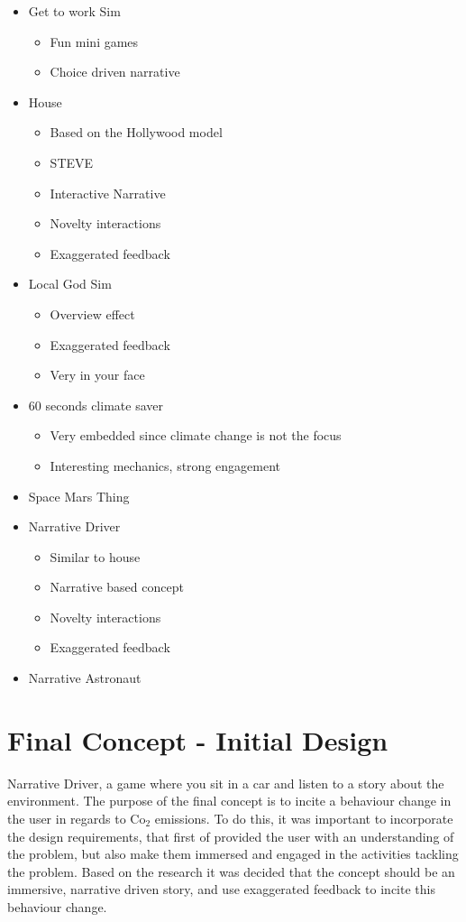 \begin{itemize}
    \item Get to work Sim
    \begin{itemize}
        \item Fun mini games
        \item Choice driven narrative
    \end{itemize}
    \item House
    \begin{itemize}
        \item Based on the Hollywood model
        \item STEVE
        \item Interactive Narrative
        \item Novelty interactions
        \item Exaggerated feedback
    \end{itemize}
    \item Local God Sim
    \begin{itemize}
        \item Overview effect
        \item Exaggerated feedback
        \item Very in your face
    \end{itemize}
    \item 60 seconds climate saver
    \begin{itemize}
        \item Very embedded since climate change is not the focus
        \item Interesting mechanics, strong engagement
    \end{itemize}
    \item Space Mars Thing
    \item Narrative Driver
    \begin{itemize}
        \item Similar to house
        \item Narrative based concept
        \item Novelty interactions
        \item Exaggerated feedback
    \end{itemize}
    \item Narrative Astronaut
\end{itemize}

\section{Final Concept - Initial Design}
Narrative Driver, a game where you sit in a car and listen to a story about the environment. The purpose of the final concept is to incite a behaviour change in the user in regards to Co$_2$ emissions. To do this, it was important to incorporate the design requirements, that first of provided the user with an understanding of the problem, but also make them immersed and engaged in the activities tackling the problem. Based on the research it was decided that the concept should be an immersive, narrative driven story, and use exaggerated feedback to incite this behaviour change.

